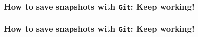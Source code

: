 \documentclass{beamer}
\begin{document}
\begin{frame}
\frametitle{How to save snapshots with \texttt{Git}: Keep working!}
\begin{center}
\end{center}
\end{frame}

\begin{frame}
\frametitle{How to save snapshots with \texttt{Git}: Keep working!}
\begin{center}
\end{center}
\end{frame}
\end{document}
